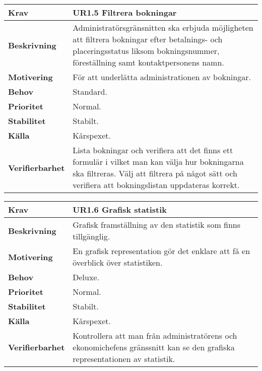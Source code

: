 \documentclass[a4paper, twoside, 11pt, titlepage]{article}
\begin{document}
		\begin{tabular} { p{2.6cm} p{12.5cm} }
			\hline
			\sffamily\textbf{Krav} & \sffamily\textbf{UR1.5 Filtrera bokningar  } \\
			\hline
			\sffamily\textbf{Beskrivning} & Administratörsgränsnitten ska erbjuda möjligheten att filtrera bokningar efter betalnings- och placeringsstatus liksom bokningsnummer, föreställning samt kontaktpersonens namn.  \\
			\hline
			\sffamily\textbf{Motivering} & För att underlätta administrationen av bokningar.  \\
			\hline
			\sffamily\textbf{Behov} & Standard.  \\
			\hline
			\sffamily\textbf{Prioritet} & Normal.  \\
			\hline
			\sffamily\textbf{Stabilitet} & Stabilt.  \\
			\hline
			\sffamily\textbf{Källa} & Kårspexet.  \\
			\hline
			\sffamily\textbf{Verifierbarhet} & Lista bokningar och verifiera att det finns ett formulär i vilket man kan välja hur bokningarna ska filtreras. Välj att filtrera på något sätt och verifiera att bokningslistan uppdateras korrekt.  \\
			\hline
		\end{tabular}
		\vspace{6mm}

		\begin{tabular} { p{2.6cm} p{12.5cm} }
			\hline
			\sffamily\textbf{Krav} & \sffamily\textbf{UR1.6 Grafisk statistik  } \\
			\hline
			\sffamily\textbf{Beskrivning} & Grafisk framställning av den statistik som finns tillgänglig.  \\
			\hline
			\sffamily\textbf{Motivering} & En grafisk representation gör det enklare att få en överblick över statistiken.  \\
			\hline
			\sffamily\textbf{Behov} & Deluxe.  \\
			\hline
			\sffamily\textbf{Prioritet} & Normal.  \\
			\hline
			\sffamily\textbf{Stabilitet} & Stabilt.  \\
			\hline
			\sffamily\textbf{Källa} & Kårspexet.  \\
			\hline
			\sffamily\textbf{Verifierbarhet} & Kontrollera att man från administratörens och ekonomichefens gränssnitt kan se den grafiska representationen av statistik.  \\
			\hline
		\end{tabular}
		\vspace{6mm}
\end{document}
